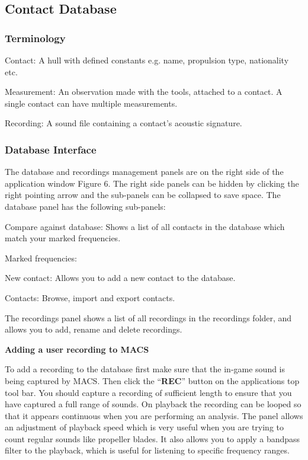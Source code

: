 \subsection{Contact Database}
\subsubsection{Terminology}
\begin{compactitem}
    \item Contact: A hull with defined constants e.g. name, propulsion type, nationality etc.
    \item Measurement: An observation made with the tools, attached to a contact. A single contact can have multiple measurements.
    \item Recording: A sound file containing a contact's acoustic signature. %
\end{compactitem}

\subsubsection{Database Interface}
The database and recordings management panels are on the right side of the application window Figure 6. The right side panels can be hidden by clicking the right pointing arrow and the sub-panels can be collapsed to save space. The database panel has the following sub-panels:

\begin{compactitem}
    \item Compare against database: Shows a list of all contacts in the database which match your marked frequencies.
    \item Marked frequencies:
    \item New contact: Allows you to add a new contact to the database.
    \item Contacts: Browse, import and export contacts.
\end{compactitem}

The recordings panel shows a list of all recordings in the recordings folder, and allows you to add, rename and delete recordings.

\textbf{Adding a user recording to MACS}

To add a recording to the database first make sure that the in-game sound is being captured by MACS. Then click the \enquote{\textbf{REC}} button on the applications top tool bar. You should capture a recording of sufficient length to ensure that you have captured a full range of sounds. On playback the recording can be looped so that it appears continuous when you are performing an analysis. The panel allows an adjustment of playback speed which is very useful when you are trying to count regular sounds like propeller blades. It also allows you to apply a bandpass filter to the playback, which is useful for listening to specific frequency ranges.

